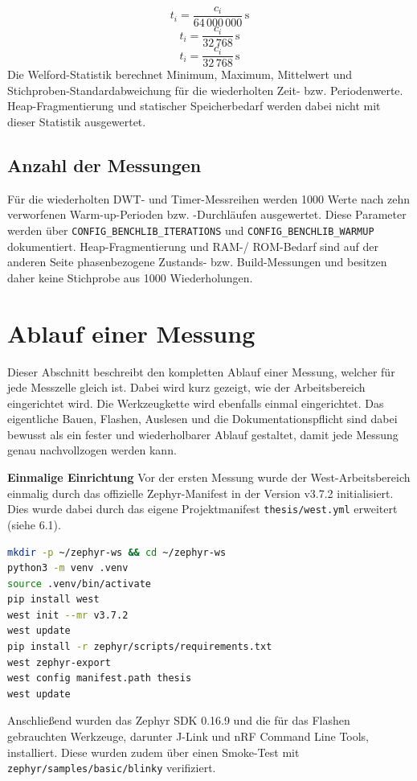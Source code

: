\[t_i = \frac{c_i}{64\,000\,000}\,\mathrm{s}\]
\[t_i = \frac{c_i}{32\,768}\,\mathrm{s}\]
\[t_i = \frac{c_i}{32\,768}\,\mathrm{s}\]
Die Welford-Statistik berechnet Minimum, Maximum, Mittelwert und Stichproben-Standardabweichung f{\"u}r die wiederholten Zeit- bzw. Periodenwerte. Heap-Fragmentierung und statischer Speicherbedarf werden dabei nicht mit dieser Statistik ausgewertet.

\subsection{Anzahl der Messungen}
F{\"u}r die wiederholten DWT- und Timer-Messreihen werden 1000 Werte nach zehn verworfenen Warm-up-Perioden bzw. -Durchl{\"a}ufen ausgewertet. Diese Parameter werden {\"u}ber \lstinline[style=fileinline]|CONFIG_BENCHLIB_ITERATIONS| und \lstinline[style=fileinline]|CONFIG_BENCHLIB_WARMUP| dokumentiert. Heap-Fragmentierung und RAM-/ ROM-Bedarf sind auf der anderen Seite phasenbezogene Zustands- bzw. Build-Messungen und besitzen daher keine Stichprobe aus 1000 Wiederholungen.

\section{Ablauf einer Messung}
Dieser Abschnitt beschreibt den kompletten Ablauf einer Messung, welcher f{\"u}r jede Messzelle gleich ist. Dabei wird kurz gezeigt, wie der Arbeitsbereich eingerichtet wird. Die Werkzeugkette wird ebenfalls einmal eingerichtet. Das eigentliche Bauen, Flashen, Auslesen und die Dokumentationspflicht sind dabei bewusst als ein fester und wiederholbarer Ablauf gestaltet, damit jede Messung genau nachvollzogen werden kann.

\textbf{Einmalige Einrichtung }Vor der ersten Messung wurde der West-Arbeitsbereich einmalig durch das offizielle Zephyr-Manifest in der Version v3.7.2 initialisiert. Dies wurde dabei durch das eigene Projektmanifest \lstinline[style=fileinline]|thesis/west.yml| erweitert (siehe 6.1).

\begin{lstlisting}[style=basecode,language=BAsh]
mkdir -p ~/zephyr-ws && cd ~/zephyr-ws
python3 -m venv .venv
source .venv/bin/activate
pip install west
west init --mr v3.7.2
west update
pip install -r zephyr/scripts/requirements.txt
west zephyr-export
west config manifest.path thesis
west update
\end{lstlisting}
Anschlie{\ss}end wurden das Zephyr SDK 0.16.9 und die f{\"u}r das Flashen gebrauchten Werkzeuge, darunter J-Link und nRF Command Line Tools, installiert. Diese wurden zudem {\"u}ber einen Smoke-Test mit \lstinline[style=fileinline]|zephyr/samples/basic/blinky| verifiziert.


